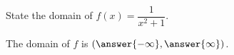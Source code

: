 \documentclass{ximera}
\author{Carl Stitz \and Jeff Zeager \and Bart Snapp \and Matthew Carr}
\begin{document}
\begin{exercise}



State the domain of $f(x)=\dfrac{1}{x^{2}+1}$.
\begin{center}
The domain of $f$ is $(\answer{-\infty},\answer{\infty})$.
\end{center}

\end{exercise}
\end{document}
